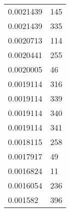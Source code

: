 \begin{tabular}{ll}
0.0021439 & 145 \\ 
0.0021439 & 335 \\ 
0.0020713 & 114 \\ 
0.0020441 & 255 \\ 
0.0020005 & 46 \\ 
0.0019114 & 316 \\ 
0.0019114 & 339 \\ 
0.0019114 & 340 \\ 
0.0019114 & 341 \\ 
0.0018115 & 258 \\ 
0.0017917 & 49 \\ 
0.0016824 & 11 \\ 
0.0016054 & 236 \\ 
0.001582 & 396 \\ 
\hline 
\end{tabular}